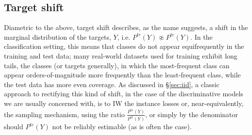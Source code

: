 \subsection{Target shift}\label{ssec:label-shift}
Diametric to the above, target shift describes, as the name suggests, a shift in the marginal
distribution of the targets, \(Y\), i.e. \( P^{tr}(Y) \not\approx P^{te}(Y) \).
%
In the classification setting, this means that classes do not appear equifrequently in the training
and test data; many real-world datasets used for training exhibit long tails, \wrt{} the classes
(or targets generally), in which the most-frequent class can appear orders-of-magnitude more
frequently than the least-frequent class, while the test data has more even coverage.
%
As discussed in \S\ref{sec:iid}, a classic approach to rectifying this kind of shift, in the case
of the discriminative models we are usually concerned with, is to \acl{IW} the instance losses or,
near-equivalently, the sampling mechanism, using the ratio \(\frac{P^{te}(Y)}{P^{tr}(Y)} \), or
simply by the denominator should \( P^{te}(Y)\) not be reliably estimable (as is often the case).
%
%
